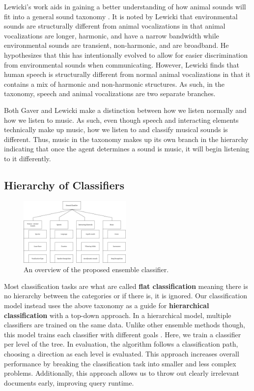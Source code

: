Lewicki's work aids in gaining a better understanding of how animal sounds will
fit into a general sound taxonomy \cite{lewicki-efficient-2002}. It is noted by
Lewicki that environmental sounds are structurally different from animal
vocalizations in that animal vocalizations are longer, harmonic, and have a
narrow bandwidth while environmental sounds are transient, non-harmonic, and are
broadband. He hypothesizes that this has intentionally evolved to allow for
easier discrimination from environmental sounds when communicating. However,
Lewicki finds that human speech is structurally different from normal animal
vocalizations in that it contains a mix of harmonic and non-harmonic structures.
As such, in the taxonomy, speech and animal vocalizations are two separate
branches.

Both Gaver and Lewicki make a distinction between how we listen normally and how
we listen to music. As such, even though speech and interacting elements
technically make up music, how we listen to and classify musical sounds is
different. Thus, music in the taxonomy makes up its own branch in the hierarchy
indicating that once the agent determines a sound is music, it will begin
listening to it differently.

\subsection{Hierarchy of Classifiers}
\label{sec:classification-hierarchy}

\begin{figure}[h!]
    \centering
    \includegraphics[width=0.49\textwidth]{figures/ensemble-overview.png}
    \caption{An overview of the proposed ensemble classifier.}
    \label{fig:classifier-hierarchy}
\end{figure}

Most classification tasks are what are called \textbf{flat classification}
meaning there is no hierarchy between the categories or if there is, it is
ignored. Our classification model instead uses the above taxonomy as a guide for \textbf{hierarchical classification} with a top-down approach. In a hierarchical model, multiple classifiers are trained on the same data. Unlike other ensemble methods though, this model trains each classifier with different goals \cite{chou-hierarchical-2003}. Here, we train a classifier per level of the tree. In evaluation, the algorithm follows a classification path, choosing a direction as each level is evaluated. This approach increases overall performance by breaking the classification task into smaller and less complex problems. Additionally, this approach allows us to throw out clearly irrelevant documents early, improving query runtime.


